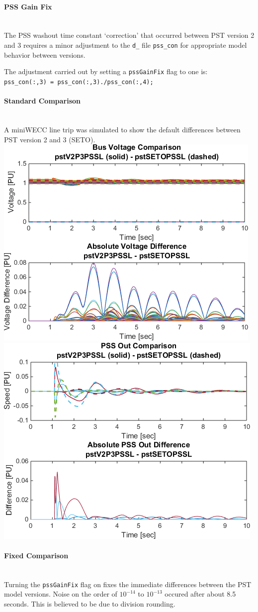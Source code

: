 \documentclass[12pt]{article}
\begin{document}
\onehalfspacing
\paragraph{PSS Gain Fix} \ \\
The PSS washout time constant `correction' that occurred between PST version 2 and 3 requires a minor adjustment to the \verb|d_| file \verb|pss_con| for appropriate model behavior between versions.

The adjustment carried out by setting a \verb|pssGainFix| flag to one is: \\ \verb|pss_con(:,3) = pss_con(:,3)./pss_con(:,4);|

\paragraph{Standard Comparison} \ \\
A miniWECC line trip was simulated to show the default differences between PST version 2 and 3 (SETO).\\


\includegraphics[width=.5\linewidth]{pstV2P3PSSLpstSETOPSSLBusV} %
\includegraphics[width=.5\linewidth]{pstV2P3PSSLpstSETOPSSLPSSout}

\paragraph{Fixed Comparison}\ \\
Turning the \verb|pssGainFix| flag on fixes the immediate differences between the PST model versions.
Noise on the order of $10^{-14}$ to $10^{-13}$  occured after about 8.5 seconds.
This is believed to be due to division rounding.\\
\end{document}
